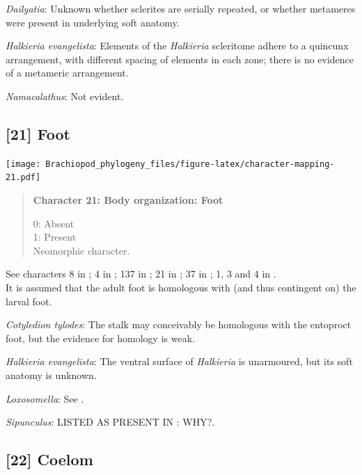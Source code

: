 \documentclass[openany]{book}
\begin{document}
\hypertarget{Dailyatia-coding-20}{}
\emph{Dailyatia}: Unknown whether sclerites are serially repeated, or
whether metameres were present in underlying soft anatomy.

\hypertarget{Halkieria_evangelista-coding-20}{}
\emph{Halkieria evangelista}: Elements of the \emph{Halkieria}
scleritome adhere to a quincunx arrangement, with different spacing of
elements in each zone; there is no evidence of a metameric arrangement.

\hypertarget{Namacalathus-coding-20}{}
\emph{Namacalathus}: Not evident.

\subsection*{{[}21{]} Foot}\label{foot}

\texttt{[image: Brachiopod\_phylogeny\_files/figure-latex/character-mapping-21.pdf]}

\begin{quote}
\textbf{Character 21: Body organization: Foot}

0: Absent\\
1: Present\\
Neomorphic character.
\end{quote}

See characters 8 in \citet{Haszprunar1996}; 4 in \citet{Vinther2008};
137 in \citet{Rouse1999}; 21 in \citet{BucklandNicks2008}; 37 in
\citet{Sutton2012}; 1, 3 and 4 in \citet{Haszprunar2008}.\\
It is assumed that the adult foot is homologous with (and thus
contingent on) the larval foot.

\hypertarget{Cotyledion_tylodes-coding-21}{}
\emph{Cotyledion tylodes}: The stalk may conceivably be homologous with
the entoproct foot, but the evidence for homology is weak.

\hypertarget{Halkieria_evangelista-coding-21}{}
\emph{Halkieria evangelista}: The ventral surface of \emph{Halkieria} is
unarmoured, but its soft anatomy is unknown.

\hypertarget{Loxosomella-coding-21}{}
\emph{Loxosomella}: See \citet{Haszprunar2008}.

\hypertarget{Sipunculus-coding-21}{}
\emph{Sipunculus}: LISTED AS PRESENT IN \citet{Smith2012}: WHY?.

\subsection*{{[}22{]} Coelom}\label{coelom}
\end{document}

